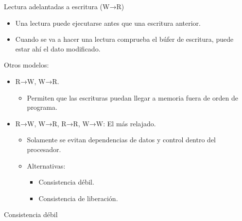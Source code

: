 \documentclass[12pt, twoside, openright]{report} %
\begin{document}
    Lectura adelantadas a escritura (W→R)

    \begin{itemize}
    
    \item
      Una lectura puede ejecutarse antes que una escritura anterior.
    \item
      Cuando se va a hacer una lectura comprueba el búfer de
      escritura, puede estar ahí el dato modificado.
    \end{itemize}

    Otros modelos:

    \begin{itemize}
    
    \item
      R→W, W→R.

      \begin{itemize}
      
      \item
        Permiten que las escrituras puedan llegar a memoria fuera de
        orden de programa.
      \end{itemize}
    \item
      R→W, W→R, R→R, W→W: El más relajado.

      \begin{itemize}
      
      \item
        Solamente se evitan dependencias de datos y control dentro del
        procesador.
      \item
        Alternativas:

        \begin{itemize}
        
        \item
          Consistencia débil.
        \item
          Consistencia de liberación.
        \end{itemize}
      \end{itemize}
    \end{itemize}

    Consistencia débil
\end{document}
